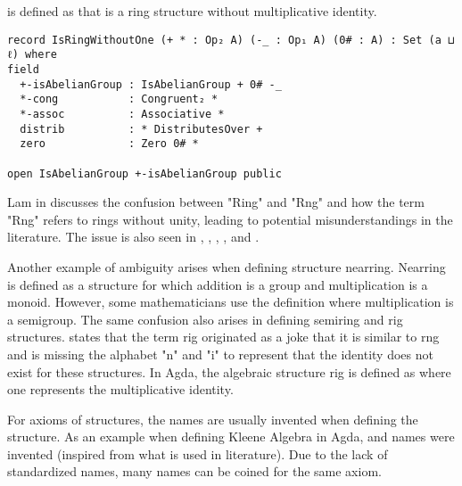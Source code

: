  is defined as  that is a ring structure without
multiplicative identity.

\begin{verbatim}
record IsRingWithoutOne (+ * : Op₂ A) (-_ : Op₁ A) (0# : A) : Set (a ⊔ ℓ) where
field
  +-isAbelianGroup : IsAbelianGroup + 0# -_
  *-cong           : Congruent₂ *
  *-assoc          : Associative *
  distrib          : * DistributesOver +
  zero             : Zero 0# *

open IsAbelianGroup +-isAbelianGroup public
\end{verbatim}

Lam in \cite{lam1991first} discusses the confusion between "Ring" and "Rng" and
how the term "Rng" refers to rings without unity, leading to potential
misunderstandings in the literature. The issue is also seen in
\cite{bosma1997magma}, \cite{jacobson1956structure},
\cite{persson1999application}, \cite{lehmann1977algebraic}, and
\cite{geuvers2002constructive}.

Another example of ambiguity arises when defining structure nearring. Nearring
is defined as a structure for which addition is a group and multiplication is a
monoid. However, some mathematicians use the definition where multiplication is
a semigroup. The same confusion also arises in defining semiring and rig
structures. \cite{rasuli2022anti} states that the term rig originated as a
joke that it is similar to rng and is missing the alphabet "n" and "i" to
represent that the identity does not exist for these structures. In Agda, the
algebraic structure rig is defined as  where one
represents the multiplicative identity.

For axioms of structures, the names are usually invented when defining the
structure. As an example when defining Kleene Algebra in Agda,
 and  names were invented
(inspired from what is used in literature). Due to the lack of standardized
names, many names can be coined for the same axiom. 

